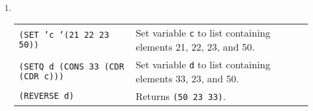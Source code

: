 \documentclass[12pt,letterpaper]{article}
\begin{document}
\begin{enumerate}
\item ~ %
  \\ \begin{tabular}{l p{4.2cm}}
    \texttt{(SET 'c '(21 22 23 50))} & Set variable \texttt{c} to list containing elements 21, 22, 23, and 50. \\
    \texttt{(SETQ d (CONS 33 (CDR (CDR c)))} & Set variable \texttt{d} to list containing elements 33, 23, and 50. \\
    \texttt{(REVERSE d)} & Returns \texttt{(50 23 33)}.
  \end{tabular}
  
\end{enumerate}
\end{document}
